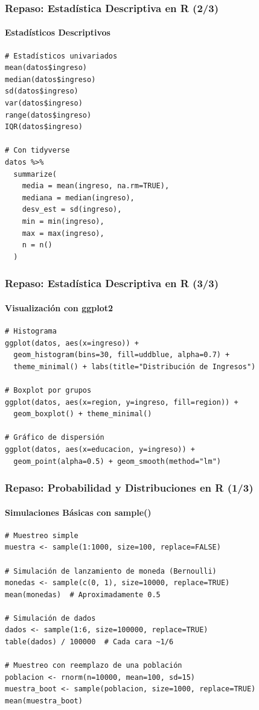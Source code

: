 \documentclass[aspectratio=169,11pt]{beamer}
\begin{document}
\begin{frame}[fragile]
\frametitle{Repaso: Estadística Descriptiva en R (2/3)}
\framesubtitle{Estadísticos Descriptivos}
\begin{lstlisting}
# Estadísticos univariados
mean(datos$ingreso)
median(datos$ingreso)
sd(datos$ingreso)
var(datos$ingreso)
range(datos$ingreso)
IQR(datos$ingreso)

# Con tidyverse
datos %>%
  summarize(
    media = mean(ingreso, na.rm=TRUE),
    mediana = median(ingreso),
    desv_est = sd(ingreso),
    min = min(ingreso),
    max = max(ingreso),
    n = n()
  )
\end{lstlisting}
\end{frame}

\begin{frame}[fragile]
\frametitle{Repaso: Estadística Descriptiva en R (3/3)}
\framesubtitle{Visualización con ggplot2}
\begin{lstlisting}
# Histograma
ggplot(datos, aes(x=ingreso)) +
  geom_histogram(bins=30, fill=uddblue, alpha=0.7) +
  theme_minimal() + labs(title="Distribución de Ingresos")

# Boxplot por grupos
ggplot(datos, aes(x=region, y=ingreso, fill=region)) +
  geom_boxplot() + theme_minimal()

# Gráfico de dispersión
ggplot(datos, aes(x=educacion, y=ingreso)) +
  geom_point(alpha=0.5) + geom_smooth(method="lm")
\end{lstlisting}
\end{frame}

\begin{frame}[fragile]
\frametitle{Repaso: Probabilidad y Distribuciones en R (1/3)}
\framesubtitle{Simulaciones Básicas con sample()}
\begin{lstlisting}
# Muestreo simple
muestra <- sample(1:1000, size=100, replace=FALSE)

# Simulación de lanzamiento de moneda (Bernoulli)
monedas <- sample(c(0, 1), size=10000, replace=TRUE)
mean(monedas)  # Aproximadamente 0.5

# Simulación de dados
dados <- sample(1:6, size=100000, replace=TRUE)
table(dados) / 100000  # Cada cara ~1/6

# Muestreo con reemplazo de una población
poblacion <- rnorm(n=10000, mean=100, sd=15)
muestra_boot <- sample(poblacion, size=1000, replace=TRUE)
mean(muestra_boot)
\end{lstlisting}
\end{frame}
\end{document}
